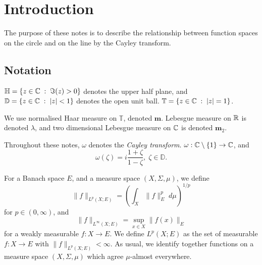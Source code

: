 \documentclass{unswmaths}
\begin{document}
\subject{}
\author{}
\title{}
\studentno{}


\newcommand{\Real}{\operatorname{Re}}
\newcommand{\Img}{\operatorname{Im}}
\newcommand{\lan}{\langle}
\newcommand{\ran}{\rangle}
\newcommand{\Proj}{\mathbb{P}}
\newcommand{\isom}{\cong}
\newcommand{\id}{{\operatorname{id}}}
\newcommand{\ha}{\boldsymbol{m}}
\newcommand{\Circ}{\mathbb{T}}
\newcommand{\BMO}{{BMO}}
\newcommand{\sgn}{\operatorname{sgn}}
\newcommand{\Diff}{\mathcal{D}}
\newcommand{\pvint}{\mathrm{p.v.}\int}
\newcommand{\Half}{\mathbb{H}}
\newcommand{\Disc}{\mathbb{D}}
\newcommand{\U}{\mathcal{U}}


\section*{Introduction}
The purpose of these notes is to describe the relationship between
function spaces on the circle and on the line by the Cayley transform.

\subsection*{Notation}
$\Half = \{z \in \Cplx\;:\;\Im(z) > 0\}$ denotes the upper half plane,
and $\Disc = \{z\in \Cplx\;:\; |z| < 1\}$ denotes the open unit ball.
$\Circ = \{z \in \Cplx\;:\; |z| = 1\}$.

We use normalised Haar measure on $\Circ$, denoted $\ha$. Lebesgue
measure on $\mathbb{R}$ is denoted $\lambda$, and two dimensional Lebesgue measure on
$\mathbb{C}$ is denoted $\ha_2$.

Throughout these notes, $\omega$ denotes the \emph{Cayley transform}.
$\omega:\mathbb{C}\setminus\{1\}\rightarrow \mathbb{C}$, and 
\begin{equation*}
    \omega(\zeta) = i\frac{1+\zeta}{1-\zeta},\;\zeta \in \Disc.
\end{equation*}

For a Banach space $E$, and a measure space $(X,\Sigma,\mu)$, we define
\begin{equation*}
    \|f\|_{L^p(X;E)} = \left(\int_X \|f\|_E^p \;d\mu\right)^{1/p}
\end{equation*}
for $p \in (0,\infty)$, and
\begin{equation*}
    \|f\|_{L^\infty(X;E)} = \sup_{x \in X} \|f(x)\|_E
\end{equation*}
for a weakly measurable $f:X\rightarrow E$. We define $L^p(X;E)$ as the set
of measurable $f:X\rightarrow E$ with $\|f\|_{L^p(X;E)} < \infty$. As usual, 
we identify together functions on a measure space $(X,\Sigma,\mu)$ 
which agree $\mu$-almost everywhere.
\end{document}

